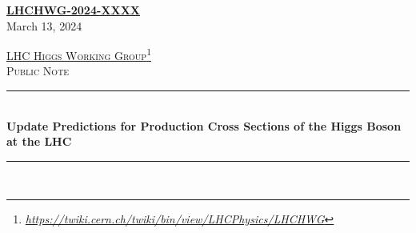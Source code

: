 \documentclass[11pt]{report}
\newcommand{\HRule}{\rule{\linewidth}{0.5mm}}
\begin{document}
\hypersetup{pageanchor=false}

\thispagestyle{empty}

	\begin{flushright}
	  {\large
            \textbf{\href{https://https://cds.cern.ch/record/XXXXX}{LHCHWG-2024-XXXX}}} \\[0.5cm]	
		{\large 	\textrm{March 13, 2024}} \\[2.0cm]
	\end{flushright}

	\begin{center}

	\textsc{\Large 	\href{https://twiki.cern.ch/twiki/bin/view/LHCPhysics/LHCHWG}{LHC Higgs Working Group}\footnote{\href{https://twiki.cern.ch/twiki/bin/view/LHCPhysics/LHCHWG}{\sl https://twiki.cern.ch/twiki/bin/view/LHCPhysics/LHCHWG}}} \\[0.5cm]
	\textsc{\Large 	Public Note} \\[1.5cm]
	
	\HRule \\[0.9cm]
	\textbf{\Large Update Predictions for Production Cross Sections of the Higgs Boson at the LHC} \\[1.0cm]
	\HRule \\[1.5cm]


\end{center}
\end{document}
